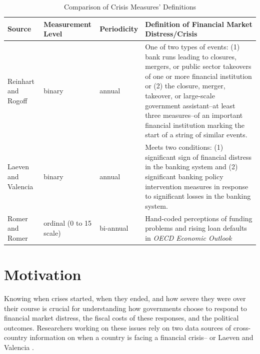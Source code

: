 \documentclass[]{article}
\begin{document}
\begin{table}
    \caption{Comparison of Crisis Measures' Definitions}
    \label{comp_table}
    \begin{center}
        \begin{tabular}{m{3cm} | m{2cm} m{2cm} m{7cm}}
            Source & Measurement Level & Periodicity &  Definition of Financial Market Distress/Crisis \\
            \hline\hline
                Reinhart and Rogoff \citeyearpar[11]{Reinhart2009,ReinhartRog2010} & binary & annual & One of two types of events: (1) bank runs leading to closures, mergers, or public sector takeovers of one or more financial institution or (2) the closure, merger, takeover, or large-scale government assistant--at least three measures--of an important financial institution marking the start of a string of similar events.  \\[1cm]
                Laeven and Valencia \citeyearpar[228]{laeven2013} & binary & annual & Meets two conditions: (1) significant sign of financial distress in the banking system and (2) significant banking policy intervention measures in response to significant losses in the banking system.  \\[1cm]
                Romer and Romer \citeyearpar[3]{Romer2015} & ordinal (0 to 15 scale) & bi-annual & Hand-coded perceptions of funding problems and rising loan defaults in \emph{OECD Economic Outlook}  \\
            \hline
        \end{tabular}
    \end{center}
\end{table}

\section{Motivation}\label{motivation}

Knowing when crises started, when they ended, and how severe they were over their course is crucial for understanding how governments choose to respond to financial market distress, the fiscal costs of these responses, and the political outcomes. Researchers working on these issues rely on two data sources of cross-country information on when a country is facing a financial crisis--\cite{Reinhart2009,ReinhartRog2010} or Laeven and Valencia \citeyearpar[and their predecessors]{laeven2013}.
\end{document}
